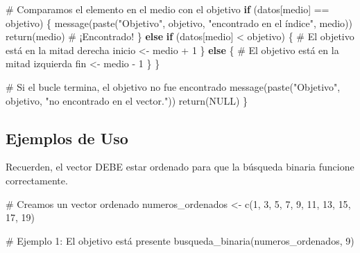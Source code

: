 \documentclass[
  spanish,
  letterpaper,
  DIV=11,
  numbers=noendperiod]{scrreprt}
\newenvironment{Shaded}{\begin{snugshade}}{\end{snugshade}}
\newcommand{\CommentTok}[1]{\textcolor[rgb]{0.37,0.37,0.37}{#1}}
\newcommand{\ConstantTok}[1]{\textcolor[rgb]{0.56,0.35,0.01}{#1}}
\newcommand{\ControlFlowTok}[1]{\textcolor[rgb]{0.00,0.23,0.31}{\textbf{#1}}}
\newcommand{\DecValTok}[1]{\textcolor[rgb]{0.68,0.00,0.00}{#1}}
\newcommand{\FunctionTok}[1]{\textcolor[rgb]{0.28,0.35,0.67}{#1}}
\newcommand{\NormalTok}[1]{\textcolor[rgb]{0.00,0.23,0.31}{#1}}
\newcommand{\OtherTok}[1]{\textcolor[rgb]{0.00,0.23,0.31}{#1}}
\newcommand{\SpecialCharTok}[1]{\textcolor[rgb]{0.37,0.37,0.37}{#1}}
\newcommand{\StringTok}[1]{\textcolor[rgb]{0.13,0.47,0.30}{#1}}
\begin{document}
\begin{Shaded}
\begin{Highlighting}[]
    \CommentTok{\# Comparamos el elemento en el medio con el objetivo}
    \ControlFlowTok{if}\NormalTok{ (datos[medio] }\SpecialCharTok{==}\NormalTok{ objetivo) \{}
      \FunctionTok{message}\NormalTok{(}\FunctionTok{paste}\NormalTok{(}\StringTok{"Objetivo"}\NormalTok{, objetivo, }\StringTok{"encontrado en el índice"}\NormalTok{, medio))}
      \FunctionTok{return}\NormalTok{(medio) }\CommentTok{\# ¡Encontrado!}
\NormalTok{    \} }\ControlFlowTok{else} \ControlFlowTok{if}\NormalTok{ (datos[medio] }\SpecialCharTok{\textless{}}\NormalTok{ objetivo) \{}
      \CommentTok{\# El objetivo está en la mitad derecha}
\NormalTok{      inicio }\OtherTok{\textless{}{-}}\NormalTok{ medio }\SpecialCharTok{+} \DecValTok{1}
\NormalTok{    \} }\ControlFlowTok{else}\NormalTok{ \{}
      \CommentTok{\# El objetivo está en la mitad izquierda}
\NormalTok{      fin }\OtherTok{\textless{}{-}}\NormalTok{ medio }\SpecialCharTok{{-}} \DecValTok{1}
\NormalTok{    \}}
\NormalTok{  \}}

  \CommentTok{\# Si el bucle termina, el objetivo no fue encontrado}
  \FunctionTok{message}\NormalTok{(}\FunctionTok{paste}\NormalTok{(}\StringTok{"Objetivo"}\NormalTok{, objetivo, }\StringTok{"no encontrado en el vector."}\NormalTok{))}
  \FunctionTok{return}\NormalTok{(}\ConstantTok{NULL}\NormalTok{)}
\NormalTok{\}}
\end{Highlighting}
\end{Shaded}

\subsection{Ejemplos de Uso}\label{ejemplos-de-uso-1}

Recuerden, el vector DEBE estar ordenado para que la búsqueda binaria
funcione correctamente.

\begin{Shaded}
\begin{Highlighting}[]
\CommentTok{\# Creamos un vector ordenado}
\NormalTok{numeros\_ordenados }\OtherTok{\textless{}{-}} \FunctionTok{c}\NormalTok{(}\DecValTok{1}\NormalTok{, }\DecValTok{3}\NormalTok{, }\DecValTok{5}\NormalTok{, }\DecValTok{7}\NormalTok{, }\DecValTok{9}\NormalTok{, }\DecValTok{11}\NormalTok{, }\DecValTok{13}\NormalTok{, }\DecValTok{15}\NormalTok{, }\DecValTok{17}\NormalTok{, }\DecValTok{19}\NormalTok{)}

\CommentTok{\# Ejemplo 1: El objetivo está presente}
\FunctionTok{busqueda\_binaria}\NormalTok{(numeros\_ordenados, }\DecValTok{9}\NormalTok{)}
\end{Highlighting}
\end{Shaded}
\end{document}
